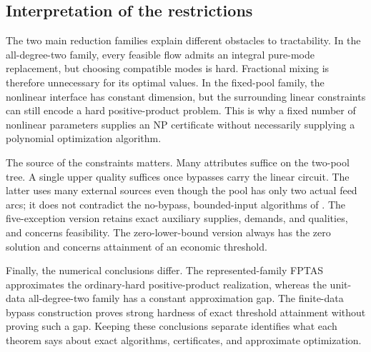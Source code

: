 \subsection{Interpretation of the restrictions}\label{s3:scope}

The two main reduction families explain different obstacles to
tractability. In the all-degree-two family, every feasible flow admits
an integral pure-mode replacement, but choosing compatible modes is
hard. Fractional mixing is therefore unnecessary for its optimal values.
In the fixed-pool family, the nonlinear interface has constant dimension,
but the surrounding linear constraints can still encode a hard
positive-product problem. This is why a fixed number of nonlinear
parameters supplies an NP certificate without necessarily supplying a
polynomial optimization algorithm.

The source of the constraints matters. Many attributes suffice on the
two-pool tree. A single upper quality suffices once bypasses carry the
linear circuit. The latter uses many external sources even though the
pool has only two actual feed arcs; it does not contradict the
no-bypass, bounded-input algorithms of
\citet{s4:boland2017,s3:haugland-hendrix2016}. The five-exception version
retains exact auxiliary supplies, demands, and qualities, and concerns
feasibility. The zero-lower-bound version always has the zero solution
and concerns attainment of an economic threshold.

Finally, the numerical conclusions differ. The represented-family FPTAS
approximates the ordinary-hard positive-product realization, whereas the
unit-data all-degree-two family has a constant approximation gap. The
finite-data bypass construction proves strong hardness of exact
threshold attainment without proving such a gap. Keeping these
conclusions separate identifies what each theorem says about exact
algorithms, certificates, and approximate optimization.
